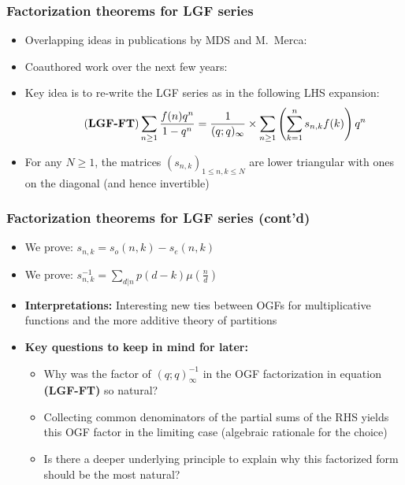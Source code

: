 \begin{frame}
\frametitle{Factorization theorems for LGF series}
\begin{itemize} 

\item Overlapping ideas in publications by MDS and M.~Merca: 
      \cite{AA,MERCA-LSFACTTHM} 
\pause\item Coauthored work over the next few years: 
      \cite{MDS-MERCA-AMM,MERCA-SCHMIDT-LSFACTTHM,MERCA-SCHMIDT-PN,MERCA-SCHMIDT-RAMJ}
\pause\item Key idea is to re-write the LGF series as in the following LHS expansion:
      \[
      \tag{\textbf{LGF-FT}}
      \sum_{n \geq 1} \frac{f(n) q^n}{1-q^n} = \frac{1}{(q; q)_{\infty}} \times \sum_{n \geq 1} \left( 
           \sum_{k=1}^{n} s_{n,k} f(k)\right) q^n
      \]
\pause\item For any $N \geq 1$, the matrices $(s_{n,k})_{1 \leq n,k \leq N}$ are lower triangular with ones on the 
      diagonal (and hence invertible) 

\end{itemize}

\end{frame}

\begin{frame}
\frametitle{Factorization theorems for LGF series (cont'd)}
\begin{itemize} 

\item We prove: $s_{n,k} = s_o(n, k) - s_e(n, k)$
\pause\item We prove: $s^{-1}_{n,k} = \sum\limits_{d|n} p(d-k) \mu\left(\frac{n}{d}\right)$
\pause\item \textbf{Interpretations:} Interesting new ties between OGFs for multiplicative functions and the 
      more additive theory of partitions
\pause\item \textbf{Key questions to keep in mind for later:}  
      \begin{itemize}
      \item Why was the factor of $(q; q)_{\infty}^{-1}$ in the OGF factorization in 
	    equation \textbf{(LGF-FT)} so natural?
      \pause\item Collecting common denominators of the partial sums of the RHS yields this 
	    OGF factor in the limiting case (algebraic rationale for the choice) 
      \pause\item Is there a deeper underlying principle to explain why this factorized form should be the most natural? 
      \end{itemize}

\end{itemize}

\end{frame}

